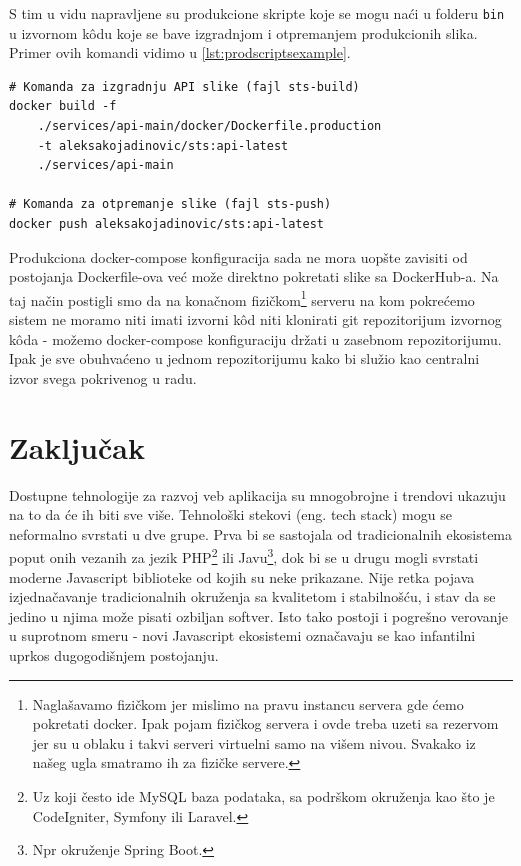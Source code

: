 \documentclass[12pt,oneside]{memoir}
\begin{document}
S tim u vidu napravljene su produkcione skripte koje se mogu naći u folderu \verb|bin| u izvornom k\^{o}du koje se bave izgradnjom i otpremanjem produkcionih slika. Primer ovih komandi vidimo u \ref{lst:prodscriptsexample}.

\begin{lstlisting}[caption={docker-compose komande.}, label={lst:prodscriptsexample}]
# Komanda za izgradnju API slike (fajl sts-build)
docker build -f 
    ./services/api-main/docker/Dockerfile.production 
    -t aleksakojadinovic/sts:api-latest 
    ./services/api-main

# Komanda za otpremanje slike (fajl sts-push)
docker push aleksakojadinovic/sts:api-latest

\end{lstlisting}

Produkciona docker-compose konfiguracija sada ne mora uopšte zavisiti od postojanja Dockerfile-ova već može direktno pokretati slike sa DockerHub-a. Na taj način postigli smo da na konačnom fizičkom\footnote{Naglašavamo fizičkom jer mislimo na pravu instancu servera gde ćemo pokretati docker. Ipak pojam fizičkog servera i ovde treba uzeti sa rezervom jer su u oblaku i takvi serveri virtuelni samo na višem nivou. Svakako iz našeg ugla smatramo ih za fizičke servere.} serveru na kom pokrećemo sistem ne moramo niti imati izvorni k\^{o}d niti klonirati git repozitorijum izvornog k\^{o}da - možemo docker-compose konfiguraciju držati u zasebnom repozitorijumu. Ipak je sve obuhvaćeno u jednom repozitorijumu kako bi služio kao centralni izvor svega pokrivenog u radu.


\chapter{Zaključak}

Dostupne tehnologije za razvoj veb aplikacija su mnogobrojne i trendovi ukazuju na to da će ih biti sve više. Tehnološki stekovi (eng. tech stack) mogu se neformalno svrstati u dve grupe. Prva bi se sastojala od tradicionalnih ekosistema poput onih vezanih za jezik PHP\footnote{Uz koji često ide MySQL baza podataka, sa podrškom okruženja kao što je CodeIgniter, Symfony ili Laravel.} ili Javu\footnote{Npr okruženje Spring Boot.}, dok bi se u drugu mogli svrstati moderne Javascript biblioteke od kojih su neke prikazane. Nije retka pojava izjednačavanje tradicionalnih okruženja sa kvalitetom i stabilnošću, i stav da se jedino u njima može pisati ozbiljan softver. Isto tako postoji i pogrešno verovanje u suprotnom smeru - novi Javascript ekosistemi označavaju se kao infantilni uprkos dugogodišnjem postojanju.
\end{document}
